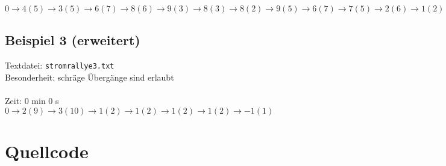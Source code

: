 \documentclass[a4paper,10pt,ngerman]{scrartcl}
\begin{document}
\noindent
$0 \rightarrow 4(5) \rightarrow 3(5) \rightarrow 6(7) \rightarrow 8(6) \rightarrow 9(3) \rightarrow 8(3) \rightarrow 8(2) \rightarrow 9(5) 
\rightarrow 6(7) \rightarrow 7(5) \rightarrow 2(6) \rightarrow 1(2) \rightarrow 3(4) \rightarrow 5(1) \rightarrow 5(2) \rightarrow 4(4) 
\rightarrow -1(1)$

\subsection{Beispiel 3 (erweitert)}\label{example:3+}
Textdatei: \texttt{stromrallye3.txt}\\
Besonderheit: schräge Übergänge sind erlaubt\\

\noindent
{}\\

\noindent
Zeit: 0 min 0 s\\

\noindent
$0 \rightarrow 2(9) \rightarrow 3(10) \rightarrow 1(2) \rightarrow 1(2) \rightarrow 1(2) \rightarrow 1(2) \rightarrow -1(1)$

\newpage
\section{Quellcode}

\end{document}
